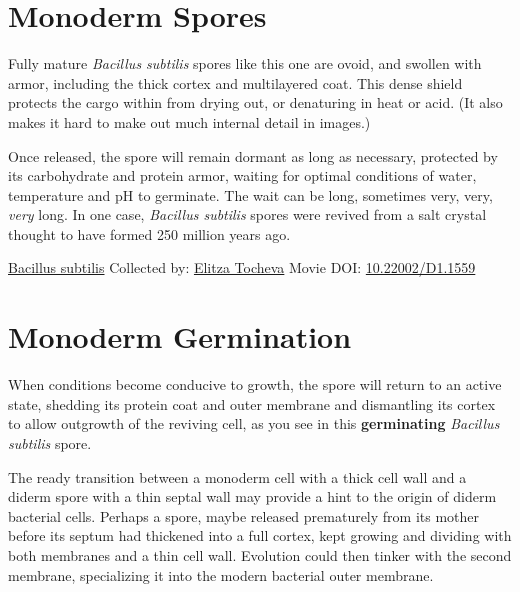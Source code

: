 \documentclass[]{tufte-book}
\begin{document}
\hypertarget{monoderm-spores}{%
\section{Monoderm Spores}\label{monoderm-spores}}

Fully mature \emph{Bacillus subtilis} spores like this one are ovoid, and swollen with armor, including the thick cortex and multilayered coat. This dense shield protects the cargo within from drying out, or denaturing in heat or acid. (It also makes it hard to make out much internal detail in images.)

Once released, the spore will remain dormant as long as necessary, protected by its carbohydrate and protein armor, waiting for optimal conditions of water, temperature and pH to germinate. The wait can be long, sometimes very, very, \emph{very} long. In one case, \emph{Bacillus subtilis} spores were revived from a salt crystal thought to have formed 250 million years ago.



\hypertarget{htmlwidget-6b174c28f28e76d80c46}{}

\label{fig:8-7}\protect\hyperlink{tree}{Bacillus subtilis} Collected by: \protect\hyperlink{elitza_tocheva}{Elitza Tocheva} Movie DOI: \href{https://doi.org/10.22002/D1.1559}{10.22002/D1.1559}

\hypertarget{monoderm-germination}{%
\section{Monoderm Germination}\label{monoderm-germination}}

When conditions become conducive to growth, the spore will return to an active state, shedding its protein coat and outer membrane and dismantling its cortex to allow outgrowth of the reviving cell, as you see in this \textbf{germinating} \emph{Bacillus subtilis} spore.

The ready transition between a monoderm cell with a thick cell wall and a diderm spore with a thin septal wall may provide a hint to the origin of diderm bacterial cells. Perhaps a spore, maybe released prematurely from its mother before its septum had thickened into a full cortex, kept growing and dividing with both membranes and a thin cell wall. Evolution could then tinker with the second membrane, specializing it into the modern bacterial outer membrane.



\hypertarget{htmlwidget-af1864149691a9ce8b17}{}
\end{document}
